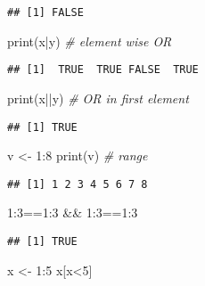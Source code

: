 \documentclass[
]{article}
\newenvironment{Shaded}{\begin{snugshade}}{\end{snugshade}}
\newcommand{\CommentTok}[1]{\textcolor[rgb]{0.56,0.35,0.01}{\textit{#1}}}
\newcommand{\DecValTok}[1]{\textcolor[rgb]{0.00,0.00,0.81}{#1}}
\newcommand{\FunctionTok}[1]{\textcolor[rgb]{0.00,0.00,0.00}{#1}}
\newcommand{\NormalTok}[1]{#1}
\newcommand{\OtherTok}[1]{\textcolor[rgb]{0.56,0.35,0.01}{#1}}
\newcommand{\SpecialCharTok}[1]{\textcolor[rgb]{0.00,0.00,0.00}{#1}}
\begin{document}
\begin{verbatim}
## [1] FALSE
\end{verbatim}

\begin{Shaded}
\begin{Highlighting}[]
\FunctionTok{print}\NormalTok{(x}\SpecialCharTok{|}\NormalTok{y) }\CommentTok{\# element wise OR}
\end{Highlighting}
\end{Shaded}

\begin{verbatim}
## [1]  TRUE  TRUE FALSE  TRUE
\end{verbatim}

\begin{Shaded}
\begin{Highlighting}[]
\FunctionTok{print}\NormalTok{(x}\SpecialCharTok{||}\NormalTok{y) }\CommentTok{\# OR in first element}
\end{Highlighting}
\end{Shaded}

\begin{verbatim}
## [1] TRUE
\end{verbatim}

\begin{Shaded}
\begin{Highlighting}[]
\NormalTok{v }\OtherTok{\textless{}{-}} \DecValTok{1}\SpecialCharTok{:}\DecValTok{8} 
\FunctionTok{print}\NormalTok{(v) }\CommentTok{\# range}
\end{Highlighting}
\end{Shaded}

\begin{verbatim}
## [1] 1 2 3 4 5 6 7 8
\end{verbatim}

\begin{Shaded}
\begin{Highlighting}[]
\DecValTok{1}\SpecialCharTok{:}\DecValTok{3}\SpecialCharTok{==}\DecValTok{1}\SpecialCharTok{:}\DecValTok{3} \SpecialCharTok{\&\&} \DecValTok{1}\SpecialCharTok{:}\DecValTok{3}\SpecialCharTok{==}\DecValTok{1}\SpecialCharTok{:}\DecValTok{3}
\end{Highlighting}
\end{Shaded}

\begin{verbatim}
## [1] TRUE
\end{verbatim}

\begin{Shaded}
\begin{Highlighting}[]
\NormalTok{x }\OtherTok{\textless{}{-}} \DecValTok{1}\SpecialCharTok{:}\DecValTok{5}
\NormalTok{x[x}\SpecialCharTok{\textless{}}\DecValTok{5}\NormalTok{]}
\end{Highlighting}
\end{Shaded}
\end{document}
